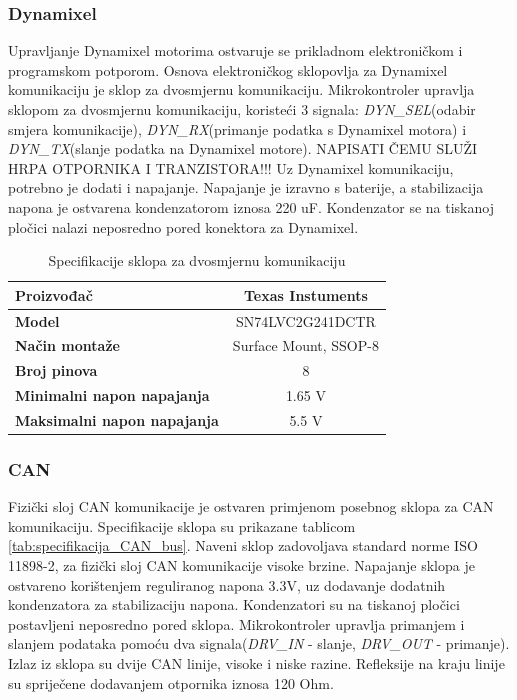 \documentclass[11pt,a4paper]{article}
\begin{document}
\subsubsection{Dynamixel}
Upravljanje Dynamixel motorima ostvaruje se prikladnom elektroničkom i programskom potporom. Osnova elektroničkog sklopovlja za Dynamixel komunikaciju je sklop za dvosmjernu komunikaciju. Mikrokontroler upravlja sklopom za dvosmjernu komunikaciju, koristeći 3 signala: \textit{DYN\_SEL}(odabir smjera komunikacije), \textit{DYN\_RX}(primanje podatka s Dynamixel motora) i \textit{DYN\_TX}(slanje podatka na Dynamixel motore). NAPISATI ČEMU SLUŽI HRPA OTPORNIKA I TRANZISTORA!!! Uz Dynamixel komunikaciju, potrebno je dodati i napajanje. Napajanje je izravno s baterije, a stabilizacija napona je ostvarena kondenzatorom iznosa 220 uF. Kondenzator se na tiskanoj pločici nalazi neposredno pored konektora za Dynamixel.

\begin{table}[H]
	\centering
	\caption{Specifikacije sklopa za dvosmjernu komunikaciju}
	\label{tab:specifikacija_dynamixel_buffer}
	\begin{tabular}{|l|c|}
		\hline
		\textbf{Proizvođač} & Texas Instuments \\ \hline 
		\textbf{Model} & SN74LVC2G241DCTR \\ \hline 
		\textbf{Način montaže} & Surface Mount, SSOP-8 \\ \hline 
		\textbf{Broj pinova} & 8 \\ \hline 
		\textbf{Minimalni napon napajanja} & 1.65 V \\ \hline 
		\textbf{Maksimalni napon napajanja} & 5.5 V    \\ \hline
	\end{tabular}
\end{table}


\subsubsection{CAN}
Fizički sloj CAN komunikacije je ostvaren primjenom posebnog sklopa za CAN komunikaciju. Specifikacije sklopa su prikazane tablicom \ref{tab:specifikacija_CAN_bus}. Naveni sklop zadovoljava standard norme ISO 11898-2, za fizički sloj CAN komunikacije visoke brzine. Napajanje sklopa je ostvareno korištenjem reguliranog napona 3.3V, uz dodavanje dodatnih kondenzatora za stabilizaciju napona. Kondenzatori su na tiskanoj pločici postavljeni neposredno pored sklopa. Mikrokontroler upravlja primanjem i slanjem podataka pomoću dva signala(\textit{DRV\_IN} - slanje, \textit{DRV\_OUT} - primanje). Izlaz iz sklopa su dvije CAN linije, visoke i niske razine. Refleksije na kraju linije su spriječene dodavanjem otpornika iznosa 120 Ohm.
\end{document}
